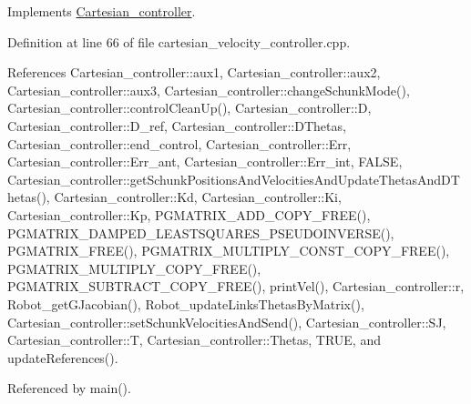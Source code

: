 Implements \hyperlink{classCartesian__controller_a8809167cab6d338a957439141fa2bf6c}{Cartesian\-\_\-controller}.



Definition at line 66 of file cartesian\-\_\-velocity\-\_\-controller.\-cpp.



References Cartesian\-\_\-controller\-::aux1, Cartesian\-\_\-controller\-::aux2, Cartesian\-\_\-controller\-::aux3, Cartesian\-\_\-controller\-::change\-Schunk\-Mode(), Cartesian\-\_\-controller\-::control\-Clean\-Up(), Cartesian\-\_\-controller\-::\-D, Cartesian\-\_\-controller\-::\-D\-\_\-ref, Cartesian\-\_\-controller\-::\-D\-Thetas, Cartesian\-\_\-controller\-::end\-\_\-control, Cartesian\-\_\-controller\-::\-Err, Cartesian\-\_\-controller\-::\-Err\-\_\-ant, Cartesian\-\_\-controller\-::\-Err\-\_\-int, F\-A\-L\-S\-E, Cartesian\-\_\-controller\-::get\-Schunk\-Positions\-And\-Velocities\-And\-Update\-Thetas\-And\-D\-Thetas(), Cartesian\-\_\-controller\-::\-Kd, Cartesian\-\_\-controller\-::\-Ki, Cartesian\-\_\-controller\-::\-Kp, P\-G\-M\-A\-T\-R\-I\-X\-\_\-\-A\-D\-D\-\_\-\-C\-O\-P\-Y\-\_\-\-F\-R\-E\-E(), P\-G\-M\-A\-T\-R\-I\-X\-\_\-\-D\-A\-M\-P\-E\-D\-\_\-\-L\-E\-A\-S\-T\-S\-Q\-U\-A\-R\-E\-S\-\_\-\-P\-S\-E\-U\-D\-O\-I\-N\-V\-E\-R\-S\-E(), P\-G\-M\-A\-T\-R\-I\-X\-\_\-\-F\-R\-E\-E(), P\-G\-M\-A\-T\-R\-I\-X\-\_\-\-M\-U\-L\-T\-I\-P\-L\-Y\-\_\-\-C\-O\-N\-S\-T\-\_\-\-C\-O\-P\-Y\-\_\-\-F\-R\-E\-E(), P\-G\-M\-A\-T\-R\-I\-X\-\_\-\-M\-U\-L\-T\-I\-P\-L\-Y\-\_\-\-C\-O\-P\-Y\-\_\-\-F\-R\-E\-E(), P\-G\-M\-A\-T\-R\-I\-X\-\_\-\-S\-U\-B\-T\-R\-A\-C\-T\-\_\-\-C\-O\-P\-Y\-\_\-\-F\-R\-E\-E(), print\-Vel(), Cartesian\-\_\-controller\-::r, Robot\-\_\-get\-G\-Jacobian(), Robot\-\_\-update\-Links\-Thetas\-By\-Matrix(), Cartesian\-\_\-controller\-::set\-Schunk\-Velocities\-And\-Send(), Cartesian\-\_\-controller\-::\-S\-J, Cartesian\-\_\-controller\-::\-T, Cartesian\-\_\-controller\-::\-Thetas, T\-R\-U\-E, and update\-References().



Referenced by main().


